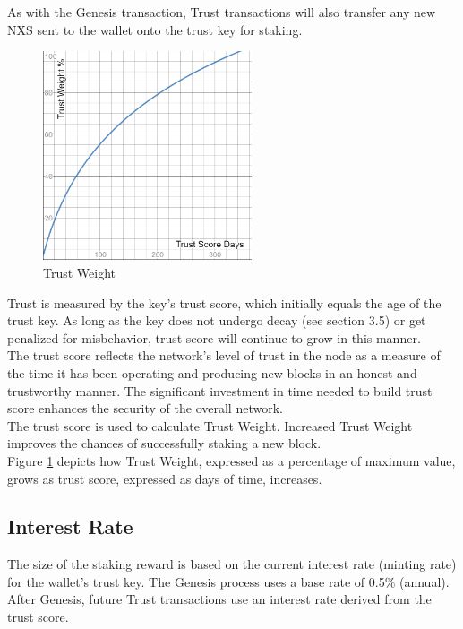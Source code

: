 \documentclass[11pt]{article}
\begin{document}
\noindent As with the Genesis transaction, Trust transactions will also transfer any new NXS sent to the wallet onto the trust key for staking. \\

\begin{figure}
    \centering
    \includegraphics[width=0.55\textwidth]{images/trustWeight.png}
    \caption{Trust Weight \label{fig:trustWeight}}
\end{figure}

\noindent Trust is measured by the key’s trust score, which initially equals the age of the trust key. As long as the key does not undergo decay (see section 3.5) or get penalized for misbehavior, trust score will continue to grow in this manner.\\

\noindent The trust score reflects the network’s level of trust in the node as a measure of the time it has been operating and producing new blocks in an honest and trustworthy manner. The significant investment in time needed to build trust score enhances the security of the overall network.\\

\noindent The trust score is used to calculate Trust Weight. Increased Trust Weight improves the chances of successfully staking a new block.\\

\noindent Figure \ref{fig:trustWeight} depicts how Trust Weight, expressed as a percentage of maximum value, grows as trust score, expressed as days of time, increases.\\

\subsection{Interest Rate}
The size of the staking reward is based on the current interest rate (minting rate) for the wallet’s trust key. The Genesis process uses a base rate of 0.5\% (annual). After Genesis, future Trust transactions use an interest rate derived from the trust score.\\
\end{document}
